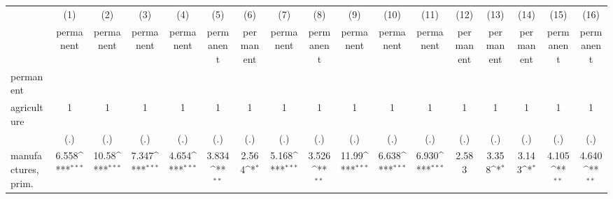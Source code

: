 {
\def\sym#1{\ifmmode^{#1}\else\(^{#1}\)\fi}
\begin{tabular}{l*{16}{c}}
\hline\hline
                    &\multicolumn{1}{c}{(1)}&\multicolumn{1}{c}{(2)}&\multicolumn{1}{c}{(3)}&\multicolumn{1}{c}{(4)}&\multicolumn{1}{c}{(5)}&\multicolumn{1}{c}{(6)}&\multicolumn{1}{c}{(7)}&\multicolumn{1}{c}{(8)}&\multicolumn{1}{c}{(9)}&\multicolumn{1}{c}{(10)}&\multicolumn{1}{c}{(11)}&\multicolumn{1}{c}{(12)}&\multicolumn{1}{c}{(13)}&\multicolumn{1}{c}{(14)}&\multicolumn{1}{c}{(15)}&\multicolumn{1}{c}{(16)}\\
                    &\multicolumn{1}{c}{permanent}&\multicolumn{1}{c}{permanent}&\multicolumn{1}{c}{permanent}&\multicolumn{1}{c}{permanent}&\multicolumn{1}{c}{permanent}&\multicolumn{1}{c}{permanent}&\multicolumn{1}{c}{permanent}&\multicolumn{1}{c}{permanent}&\multicolumn{1}{c}{permanent}&\multicolumn{1}{c}{permanent}&\multicolumn{1}{c}{permanent}&\multicolumn{1}{c}{permanent}&\multicolumn{1}{c}{permanent}&\multicolumn{1}{c}{permanent}&\multicolumn{1}{c}{permanent}&\multicolumn{1}{c}{permanent}\\
\hline
permanent           &                     &                     &                     &                     &                     &                     &                     &                     &                     &                     &                     &                     &                     &                     &                     &                     \\
agriculture         &           1         &           1         &           1         &           1         &           1         &           1         &           1         &           1         &           1         &           1         &           1         &           1         &           1         &           1         &           1         &           1         \\
                    &         (.)         &         (.)         &         (.)         &         (.)         &         (.)         &         (.)         &         (.)         &         (.)         &         (.)         &         (.)         &         (.)         &         (.)         &         (.)         &         (.)         &         (.)         &         (.)         \\
[1em]
manufactures, prim. &       6.558\sym{***}&       10.58\sym{***}&       7.347\sym{***}&       4.654\sym{***}&       3.834\sym{**} &       2.564\sym{*}  &       5.168\sym{***}&       3.526\sym{**} &       11.99\sym{***}&       6.638\sym{***}&       6.930\sym{***}&       2.583         &       3.358\sym{*}  &       3.143\sym{*}  &       4.105\sym{**} &       4.640\sym{**} \\

\end{tabular}}
